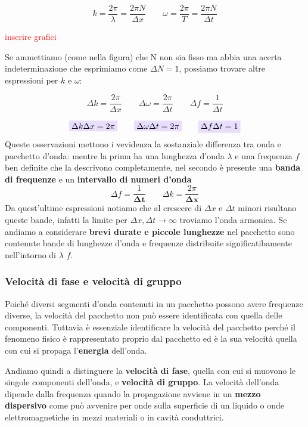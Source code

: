 \documentclass[x11names]{article}
\newcommand{\viola}[1]{\colorbox{yred}{$\displaystyle #1$}}
\begin{document}
	\[ 
	k = \frac{2\pi}{\lambda}= \frac{2\pi N}{\Delta x} \qquad \omega = \frac{2\pi}{T} = \frac{2\pi N}{\Delta t}
	\]
	
	\begin{center}
		\textcolor{red}{inserire grafici}
	\end{center}
	Se ammettiamo (come nella figura) che N non sia fisso ma abbia una acerta indeterminazione che esprimiamo come \(\Delta N = 1\), possiamo trovare altre espressioni per \(k\) e \(\omega\):
	
	\[ 
	\boxed{\Delta k = \frac{2\pi}{\Delta x}} \qquad \boxed{ \Delta\omega = \frac{2\pi}{\Delta t}} \qquad \boxed{\Delta f = \frac{1}{\Delta t}}
	\]
	
	\[ 
	\viola{\Delta k \Delta x = 2\pi} \qquad \viola{\Delta \omega \Delta t = 2\pi} \qquad \viola{\Delta f \Delta t = 1}
	\]
	Queste osservazioni mettono i vevidenza la sostanziale differenza tra onda e pacchetto d'onda: mentre la prima ha una lunghezza d'onda \(\lambda\)  e una frequenza \(f\) ben definite che la descrivono completamente, nel secondo è presente una \textbf{banda di frequenze} e un \textbf{intervallo di numeri d'onda}
	\[ 
	\Delta f = \frac{1}{\boldsymbol{\Delta t}} \qquad \Delta k = \frac{2\pi}{\boldsymbol{\Delta x}}
	\]
	Da quest'ultime espressioni notiamo che al crescere di \(\Delta x\) e \(\Delta t\) minori risultano queste bande, infatti la limite per \(\Delta x,\Delta t \to \infty\) troviamo l'onda armonica. Se andiamo a considerare \textbf{brevi durate e piccole lunghezze} nel pacchetto sono contenute bande di lunghezze d'onda e frequenze distribuite significatibamente nell'intorno di \(\lambda\) \(f\).
	
		\subsubsection{Velocità di fase e velocità di gruppo}
		Poiché diversi segmenti d'onda contenuti in un pacchetto possono avere frequenze diverse, la velocità del pacchetto non può essere identificata con quella delle componenti. Tuttavia è essenziale identificare la velocità del pacchetto perché il fenomeno fisico è rappresentato proprio dal pacchetto ed è la sua velocità quella con cui si propaga l'\textbf{energia} dell'onda.     
		
		Andiamo quindi a distinguere la \textbf{velocità di fase}, quella con cui si muovono le singole componenti dell'onda, e \textbf{velocità di gruppo}. 
		La velocità dell'onda dipende dalla frequenza quando la propagazione avviene in un \textbf{mezzo dispersivo} come può avvenire per onde sulla superficie di un liquido o onde elettromagnetiche in mezzi materiali o in cavità conduttrici.\\
		
\end{document}
